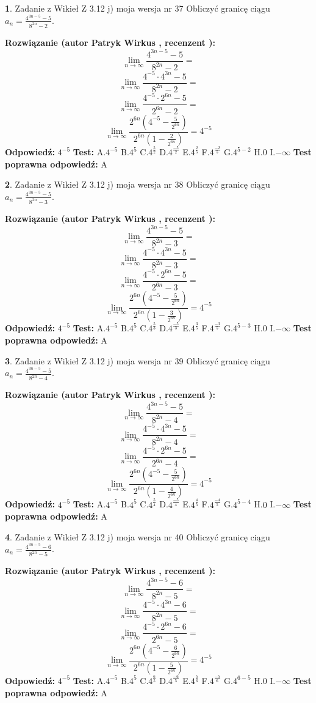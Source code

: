 \documentclass[12pt, a4paper]{article}
\theoremstyle{definition} %
\newtheorem{zad}{}
\newcommand{\zadStart}[1]{\begin{zad}#1\newline}
\newcommand{\zadStop}{\end{zad}}
\newcommand{\rozwStart}[2]{\noindent \textbf{Rozwiązanie (autor #1 , recenzent #2): }\newline}
\newcommand{\rozwStop}{\newline}
\newcommand{\odpStart}{\noindent \textbf{Odpowiedź:}\newline}
\newcommand{\odpStop}{\newline}
\newcommand{\testStart}{\noindent \textbf{Test:}\newline}
\newcommand{\testStop}{\newline}
\newcommand{\kluczStart}{\noindent \textbf{Test poprawna odpowiedź:}\newline}
\newcommand{\kluczStop}{\newline}
\begin{document}
\zadStart{Zadanie z Wikieł Z 3.12 j) moja wersja nr 37}
Obliczyć granicę ciągu $a_{n}=\frac{4^{3n-5}-5}{8^{2n}-2}$.
\zadStop
\rozwStart{Patryk Wirkus}{}
$$\lim\limits_{n\to\infty}\frac{4^{3n-5}-5}{8^{2n}-2}=$$
$$\lim\limits_{n\to\infty}\frac{4^{-5} \cdot 4^{3n}-5}{8^{2n}-2}=$$
$$\lim\limits_{n\to\infty}\frac{4^{-5} \cdot 2^{6n}-5}{2^{6n}-2}=$$
$$\lim\limits_{n\to\infty}\frac{2^{6n}(4^{-5} - \frac{5}{2^{6n}})}{2^{6n}(1-\frac{2}{2^{6n}})}= 4^{-5}$$
\rozwStop
\odpStart
$4^{-5}$
\odpStop
\testStart
A.$4^{-5}$
B.$4^{5}$
C.$4^{\frac{5}{2}}$
D.$4^{\frac{-5}{2}}$
E.$4^{\frac{2}{5}}$
F.$4^{\frac{-2}{5}}$
G.$4^{5-2}$
H.$0$
I.$-\infty$
\testStop
\kluczStart
A
\kluczStop



\zadStart{Zadanie z Wikieł Z 3.12 j) moja wersja nr 38}
Obliczyć granicę ciągu $a_{n}=\frac{4^{3n-5}-5}{8^{2n}-3}$.
\zadStop
\rozwStart{Patryk Wirkus}{}
$$\lim\limits_{n\to\infty}\frac{4^{3n-5}-5}{8^{2n}-3}=$$
$$\lim\limits_{n\to\infty}\frac{4^{-5} \cdot 4^{3n}-5}{8^{2n}-3}=$$
$$\lim\limits_{n\to\infty}\frac{4^{-5} \cdot 2^{6n}-5}{2^{6n}-3}=$$
$$\lim\limits_{n\to\infty}\frac{2^{6n}(4^{-5} - \frac{5}{2^{6n}})}{2^{6n}(1-\frac{3}{2^{6n}})}= 4^{-5}$$
\rozwStop
\odpStart
$4^{-5}$
\odpStop
\testStart
A.$4^{-5}$
B.$4^{5}$
C.$4^{\frac{5}{3}}$
D.$4^{\frac{-5}{3}}$
E.$4^{\frac{3}{5}}$
F.$4^{\frac{-3}{5}}$
G.$4^{5-3}$
H.$0$
I.$-\infty$
\testStop
\kluczStart
A
\kluczStop



\zadStart{Zadanie z Wikieł Z 3.12 j) moja wersja nr 39}
Obliczyć granicę ciągu $a_{n}=\frac{4^{3n-5}-5}{8^{2n}-4}$.
\zadStop
\rozwStart{Patryk Wirkus}{}
$$\lim\limits_{n\to\infty}\frac{4^{3n-5}-5}{8^{2n}-4}=$$
$$\lim\limits_{n\to\infty}\frac{4^{-5} \cdot 4^{3n}-5}{8^{2n}-4}=$$
$$\lim\limits_{n\to\infty}\frac{4^{-5} \cdot 2^{6n}-5}{2^{6n}-4}=$$
$$\lim\limits_{n\to\infty}\frac{2^{6n}(4^{-5} - \frac{5}{2^{6n}})}{2^{6n}(1-\frac{4}{2^{6n}})}= 4^{-5}$$
\rozwStop
\odpStart
$4^{-5}$
\odpStop
\testStart
A.$4^{-5}$
B.$4^{5}$
C.$4^{\frac{5}{4}}$
D.$4^{\frac{-5}{4}}$
E.$4^{\frac{4}{5}}$
F.$4^{\frac{-4}{5}}$
G.$4^{5-4}$
H.$0$
I.$-\infty$
\testStop
\kluczStart
A
\kluczStop



\zadStart{Zadanie z Wikieł Z 3.12 j) moja wersja nr 40}
Obliczyć granicę ciągu $a_{n}=\frac{4^{3n-5}-6}{8^{2n}-5}$.
\zadStop
\rozwStart{Patryk Wirkus}{}
$$\lim\limits_{n\to\infty}\frac{4^{3n-5}-6}{8^{2n}-5}=$$
$$\lim\limits_{n\to\infty}\frac{4^{-5} \cdot 4^{3n}-6}{8^{2n}-5}=$$
$$\lim\limits_{n\to\infty}\frac{4^{-5} \cdot 2^{6n}-6}{2^{6n}-5}=$$
$$\lim\limits_{n\to\infty}\frac{2^{6n}(4^{-5} - \frac{6}{2^{6n}})}{2^{6n}(1-\frac{5}{2^{6n}})}= 4^{-5}$$
\rozwStop
\odpStart
$4^{-5}$
\odpStop
\testStart
A.$4^{-5}$
B.$4^{5}$
C.$4^{\frac{6}{5}}$
D.$4^{\frac{-6}{5}}$
E.$4^{\frac{5}{6}}$
F.$4^{\frac{-5}{6}}$
G.$4^{6-5}$
H.$0$
I.$-\infty$
\testStop
\kluczStart
A
\kluczStop
\end{document}
